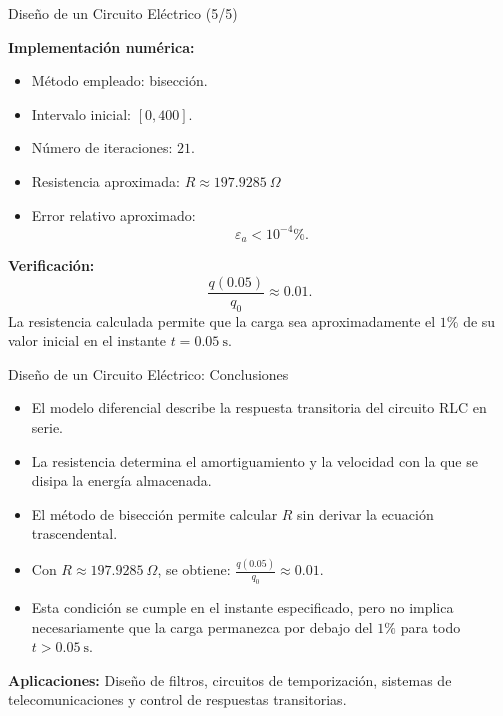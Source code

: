 \documentclass[../../main.tex]{subfiles}
\begin{document}
\begin{frame}{Dise\~no de un Circuito El\'ectrico (5/5)}

\textbf{Implementaci\'on num\'erica:}

\begin{itemize}
  \item M\'etodo empleado: bisecci\'on.
  \item Intervalo inicial: \([0,400]\).
  \item N\'umero de iteraciones: \(21\).
  \item Resistencia aproximada:
  \(
  \boxed{
  R\approx197.9285\ \Omega
  }
  \)
  \item Error relativo aproximado:
  \[
  \varepsilon_a<10^{-4}\%.
  \]
\end{itemize}

\textbf{Verificaci\'on:}
\[
\frac{q(0.05)}{q_0}
\approx0.01.
\]
La resistencia calculada permite que la carga sea aproximadamente
el \(1\%\) de su valor inicial en el instante \(t=0.05\ \text{s}\).

\end{frame}



\begin{frame}{Dise\~no de un Circuito El\'ectrico: Conclusiones}
\begin{itemize}
  \item El modelo diferencial describe la respuesta transitoria
        del circuito RLC en serie.

  \item La resistencia determina el amortiguamiento y la velocidad
        con la que se disipa la energ\'ia almacenada.

  \item El m\'etodo de bisecci\'on permite calcular \(R\) sin
        derivar la ecuaci\'on trascendental.

  \item Con \(R\approx197.9285\ \Omega\), se obtiene:
  \(
  \frac{q(0.05)}{q_0}\approx0.01.
  \)

  \item Esta condici\'on se cumple en el instante especificado,
        pero no implica necesariamente que la carga permanezca
        por debajo del \(1\%\) para todo \(t>0.05\ \text{s}\).
\end{itemize}

\textbf{Aplicaciones:}
Dise\~no de filtros, circuitos de temporizaci\'on, sistemas de
telecomunicaciones y control de respuestas transitorias.

\end{frame}
\end{document}

